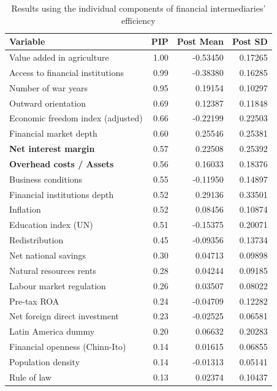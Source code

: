 \begin{enumerate}[resume]
    \begin{table}[ht!]    
      \caption{Results using the individual components of financial intermediaries' efficiency}\label{chA:tab2}
      \centering
      \footnotesize
      \begin{tabular}{lrrr}
        \toprule
      Variable & PIP & Post Mean & Post SD \\
        \midrule
      Value added in agriculture & 1.00 & -0.53450 & 0.17265 \\
        Access to financial institutions & 0.99 & -0.38380 & 0.16285 \\ 
        Number of war years & 0.95 & 0.19154 & 0.10297 \\ 
        Outward orientation & 0.69 & 0.12387 & 0.11848 \\
        Economic freedom index (adjusted) & 0.66 & -0.22199 & 0.22503 \\ 
        Financial market depth & 0.60 & 0.25546 & 0.25381 \\
        \textbf{Net interest margin} & 0.57 & 0.22508 & 0.25392 \\ 
        \textbf{Overhead costs / Assets} & 0.56 & 0.16033 & 0.18376 \\ 
        Business conditions & 0.55 & -0.11950 & 0.14897 \\
        Financial institutions depth & 0.52 & 0.29136 & 0.33501 \\ 
        Inflation & 0.52 & 0.08456 & 0.10874 \\ 
        Education index (UN) & 0.51 & -0.15375 & 0.20071 \\
        Redistribution & 0.45 & -0.09356 & 0.13734 \\ 
        Net national savings & 0.30 & 0.04713 & 0.09898 \\
        Natural resources rents & 0.28 & 0.04244 & 0.09185 \\ 
        Labour market regulation & 0.26 & 0.03507 & 0.08022 \\
        Pre-tax ROA & 0.24 & -0.04709 & 0.12282 \\ 
        Net foreign direct investment & 0.23 & -0.02525 & 0.06581 \\
        Latin America dummy & 0.20 & 0.06632 & 0.20283 \\
        Financial openness (Chinn-Ito) & 0.14 & 0.01615 & 0.06855 \\
        Population density & 0.14 & -0.01313 & 0.05141 \\ 
        Rule of law & 0.13 & 0.02374 & 0.10437 \\

\end{tabular}
\end{table}
\end{enumerate}
